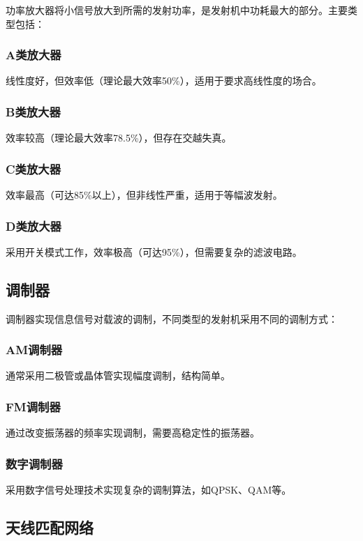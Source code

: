 \documentclass[12pt,UTF8]{ctexbook}
\begin{document}
功率放大器将小信号放大到所需的发射功率，是发射机中功耗最大的部分。主要类型包括：

\subsubsection{A类放大器}
线性度好，但效率低（理论最大效率50\%），适用于要求高线性度的场合。

\subsubsection{B类放大器}
效率较高（理论最大效率78.5\%），但存在交越失真。

\subsubsection{C类放大器}
效率最高（可达85\%以上），但非线性严重，适用于等幅波发射。

\subsubsection{D类放大器}
采用开关模式工作，效率极高（可达95\%），但需要复杂的滤波电路。

\subsection{调制器}

调制器实现信息信号对载波的调制，不同类型的发射机采用不同的调制方式：

\subsubsection{AM调制器}
通常采用二极管或晶体管实现幅度调制，结构简单。

\subsubsection{FM调制器}
通过改变振荡器的频率实现调制，需要高稳定性的振荡器。

\subsubsection{数字调制器}
采用数字信号处理技术实现复杂的调制算法，如QPSK、QAM等。

\subsection{天线匹配网络}
\end{document}
